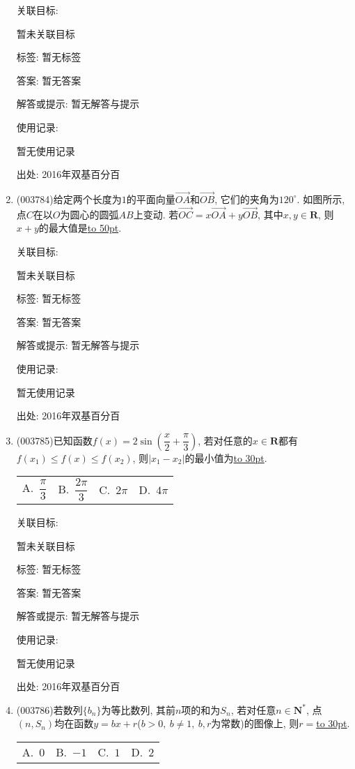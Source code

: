 \documentclass[10pt,a4paper]{article}
\newcommand{\blank}[1]{\underline{\hbox to #1pt{}}}
\newcommand{\fourch}[4]{\par\begin{tabular}{p{.23\textwidth}p{.23\textwidth}p{.23\textwidth}p{.23\textwidth}}
A.~#1 &B.~#2& C.~#3& D.~#4
\end{tabular}}
\begin{document}
\begin{enumerate}[1.]
关联目标:

暂未关联目标



标签: 暂无标签

答案: 暂无答案

解答或提示: 暂无解答与提示

使用记录:

暂无使用记录


出处: 2016年双基百分百
\item { (003784)}给定两个长度为$1$的平面向量$\overrightarrow{OA}$和$\overrightarrow{OB}$, 它们的夹角为$120^\circ$. 如图所示, 点$C$在以$O$为圆心的圆弧$AB$上变动. 若$\overrightarrow{OC}=x\overrightarrow{OA}+y\overrightarrow{OB}$, 其中$x,y\in \mathbf{R}$, 则$x+y$的最大值是\blank{50}.
\begin{center}
\end{center}


关联目标:

暂未关联目标



标签: 暂无标签

答案: 暂无答案

解答或提示: 暂无解答与提示

使用记录:

暂无使用记录


出处: 2016年双基百分百
\item { (003785)}已知函数$f(x)=2\sin\left(\dfrac x2+\dfrac \pi 3\right)$, 若对任意的$x\in \mathbf{R}$都有$f(x_1)\le f(x)\le f(x_2)$, 则$|x_1-x_2|$的最小值为\blank{30}.
\fourch{$\dfrac \pi 3$}{$\dfrac{2\pi}{3}$}{$2\pi$}{$4\pi$}


关联目标:

暂未关联目标



标签: 暂无标签

答案: 暂无答案

解答或提示: 暂无解答与提示

使用记录:

暂无使用记录


出处: 2016年双基百分百
\item { (003786)}若数列$\{b_n\}$为等比数列, 其前$n$项的和为$S_n$, 若对任意$n\in \mathbf{N}^*$, 点$(n,S_n)$均在函数$y=bx+r$($b>0, \ b\ne 1, \ b,r$为常数)的图像上, 则$r=$\blank{30}.
\fourch{$0$}{$-1$}{$1$}{$2$}



\end{enumerate}
\end{document}
